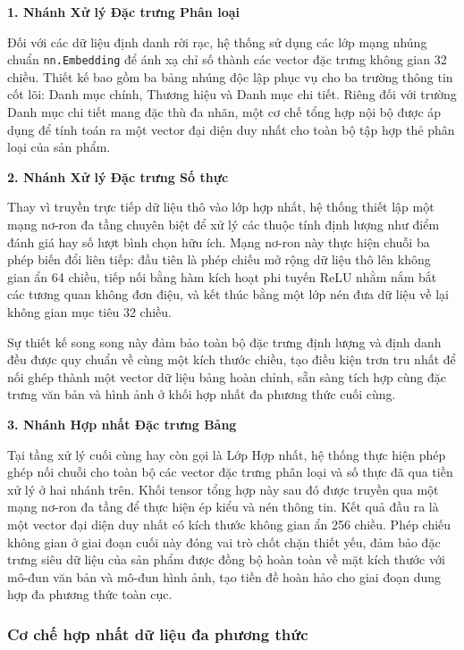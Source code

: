 \vspace{0.3cm}
\noindent \textbf{1. Nhánh Xử lý Đặc trưng Phân loại}

Đối với các dữ liệu định danh rời rạc, hệ thống sử dụng các lớp mạng nhúng chuẩn \texttt{nn.Embedding} để ánh xạ chỉ số thành các vector đặc trưng không gian 32 chiều. Thiết kế bao gồm ba bảng nhúng độc lập phục vụ cho ba trường thông tin cốt lõi: Danh mục chính, Thương hiệu và Danh mục chi tiết. Riêng đối với trường Danh mục chi tiết mang đặc thù đa nhãn, một cơ chế tổng hợp nội bộ được áp dụng để tính toán ra một vector đại diện duy nhất cho toàn bộ tập hợp thẻ phân loại của sản phẩm.

\vspace{0.3cm}
\noindent \textbf{2. Nhánh Xử lý Đặc trưng Số thực}

Thay vì truyền trực tiếp dữ liệu thô vào lớp hợp nhất, hệ thống thiết lập một mạng nơ-ron đa tầng chuyên biệt để xử lý các thuộc tính định lượng như điểm đánh giá hay số lượt bình chọn hữu ích. Mạng nơ-ron này thực hiện chuỗi ba phép biến đổi liên tiếp: đầu tiên là phép chiếu mở rộng dữ liệu thô lên không gian ẩn 64 chiều, tiếp nối bằng hàm kích hoạt phi tuyến ReLU nhằm nắm bắt các tương quan không đơn điệu, và kết thúc bằng một lớp nén đưa dữ liệu về lại không gian mục tiêu 32 chiều. 

Sự thiết kế song song này đảm bảo toàn bộ đặc trưng định lượng và định danh đều được quy chuẩn về cùng một kích thước chiều, tạo điều kiện trơn tru nhất để nối ghép thành một vector dữ liệu bảng hoàn chỉnh, sẵn sàng tích hợp cùng đặc trưng văn bản và hình ảnh ở khối hợp nhất đa phương thức cuối cùng.

\vspace{0.3cm}
\noindent \textbf{3. Nhánh Hợp nhất Đặc trưng Bảng}

Tại tầng xử lý cuối cùng hay còn gọi là Lớp Hợp nhất, hệ thống thực hiện phép ghép nối chuỗi cho toàn bộ các vector đặc trưng phân loại và số thực đã qua tiền xử lý ở hai nhánh trên. Khối tensor tổng hợp này sau đó được truyền qua một mạng nơ-ron đa tầng để thực hiện ép kiểu và nén thông tin. Kết quả đầu ra là một vector đại diện duy nhất có kích thước không gian ẩn 256 chiều. Phép chiếu không gian ở giai đoạn cuối này đóng vai trò chốt chặn thiết yếu, đảm bảo đặc trưng siêu dữ liệu của sản phẩm được đồng bộ hoàn toàn về mặt kích thước với mô-đun văn bản và mô-đun hình ảnh, tạo tiền đề hoàn hảo cho giai đoạn dung hợp đa phương thức toàn cục.

\subsubsection{Cơ chế hợp nhất dữ liệu đa phương thức}

